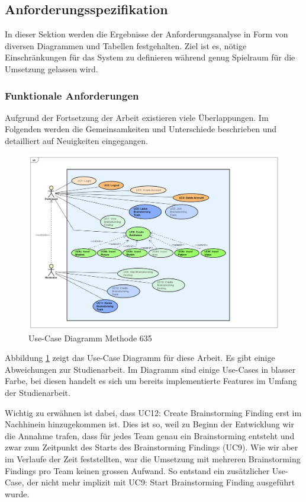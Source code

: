 \subsection{Anforderungsspezifikation}
In dieser Sektion werden die Ergebnisse der Anforderungsanalyse in Form von diversen Diagrammen und Tabellen festgehalten. Ziel ist es, nötige Einschränkungen für das System zu definieren während genug Spielraum für die Umsetzung gelassen wird. 

\subsubsection{Funktionale Anforderungen}
Aufgrund der Fortsetzung der Arbeit existieren viele Überlappungen. Im Folgenden werden die Gemeinsamkeiten und Unterschiede beschrieben und detailliert auf Neuigkeiten eingegangen. 


\begin{figure}[h]
	\centering
	\includegraphics[width=1\linewidth]{./img/anforderungen/UC-Methode635.png}
	\caption{Use-Case Diagramm Methode 635}
	\label{fig:uc-methode635}
\end{figure}
Abbildung \ref{fig:uc-methode635} zeigt das Use-Case Diagramm für diese Arbeit. Es gibt einige Abweichungen zur Studienarbeit. Im Diagramm sind einige Use-Cases in blasser Farbe, bei diesen handelt es sich um bereits implementierte Features im Umfang der Studienarbeit. 

Wichtig zu erwähnen ist dabei, dass UC12: Create Brainstorming Finding erst im Nachhinein hinzugekommen ist. Dies ist so, weil zu Beginn der Entwicklung wir die Annahme trafen, dass für jedes Team genau ein Brainstorming entsteht und zwar zum Zeitpunkt des Starts des Brainstorming Findings (UC9). Wie wir aber im Verlaufe der Zeit feststellten, war die Umsetzung mit mehreren Brainstorming Findings pro Team keinen grossen Aufwand. So entstand ein zusätzlicher Use-Case, der nicht mehr implizit mit UC9: Start Brainstorming Finding ausgeführt wurde.

